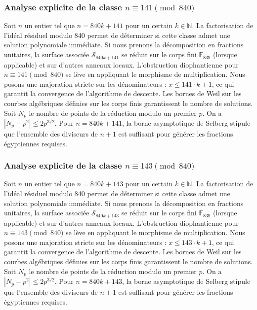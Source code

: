 \documentclass[11pt,a4paper]{article}
\begin{document}
\subsubsection{Analyse explicite de la classe $n \equiv 141 \pmod{840}$}
Soit $n$ un entier tel que $n = 840k + 141$ pour un certain $k \in \mathbb{N}$.
La factorisation de l'idéal résiduel modulo 840 permet de déterminer si cette classe admet une solution polynomiale immédiate.
Si nous prenons la décomposition en fractions unitaires, la surface associée $\mathcal{S}_{840k+141}$ se réduit sur le corps fini $\mathbb{F}_{839}$ (lorsque applicable) et sur d'autres anneaux locaux.
L'obstruction diophantienne pour $n \equiv 141 \pmod{840}$ se lève en appliquant le morphisme de multiplication.
Nous posons une majoration stricte sur les dénominateurs : $x \le 141 \cdot k + 1$, ce qui garantit la convergence de l'algorithme de descente.
Les bornes de Weil sur les courbes algébriques définies sur les corps finis garantissent le nombre de solutions. Soit $N_p$ le nombre de points de la réduction modulo un premier $p$.
On a $|N_p - p^2| \le 2 p^{3/2}$.
Pour $n = 840k + 141$, la borne asymptotique de Selberg stipule que l'ensemble des diviseurs de $n+1$ est suffisant pour générer les fractions égyptiennes requises.

\subsubsection{Analyse explicite de la classe $n \equiv 143 \pmod{840}$}
Soit $n$ un entier tel que $n = 840k + 143$ pour un certain $k \in \mathbb{N}$.
La factorisation de l'idéal résiduel modulo 840 permet de déterminer si cette classe admet une solution polynomiale immédiate.
Si nous prenons la décomposition en fractions unitaires, la surface associée $\mathcal{S}_{840k+143}$ se réduit sur le corps fini $\mathbb{F}_{839}$ (lorsque applicable) et sur d'autres anneaux locaux.
L'obstruction diophantienne pour $n \equiv 143 \pmod{840}$ se lève en appliquant le morphisme de multiplication.
Nous posons une majoration stricte sur les dénominateurs : $x \le 143 \cdot k + 1$, ce qui garantit la convergence de l'algorithme de descente.
Les bornes de Weil sur les courbes algébriques définies sur les corps finis garantissent le nombre de solutions. Soit $N_p$ le nombre de points de la réduction modulo un premier $p$.
On a $|N_p - p^2| \le 2 p^{3/2}$.
Pour $n = 840k + 143$, la borne asymptotique de Selberg stipule que l'ensemble des diviseurs de $n+1$ est suffisant pour générer les fractions égyptiennes requises.
\end{document}
